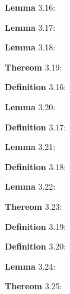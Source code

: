 \documentclass{article}
\begin{document}
\par 
\textbf{Lemma} 3.16:
\newline

\par 
\textbf{Lemma} 3.17:
\newline

\par 
\textbf{Lemma} 3.18:
\newline

\par 
\textbf{Thereom} 3.19:
\newline


\par 
\textbf{Definition} 3.16:
\newline

\par 
\textbf{Lemma} 3.20:
\newline

\par 
\textbf{Definition} 3.17:
\newline

\par 
\textbf{Lemma} 3.21:
\newline


\par 
\textbf{Definition} 3.18:
\newline

\par 
\textbf{Lemma} 3.22:
\newline

\par 
\textbf{Thereom} 3.23:
\newline

\par 
\textbf{Definition} 3.19:
\newline

\par 
\textbf{Definition} 3.20:
\newline

\par 
\textbf{Lemma} 3.24:
\newline

\par 
\textbf{Thereom} 3.25:
\newline
\end{document}
